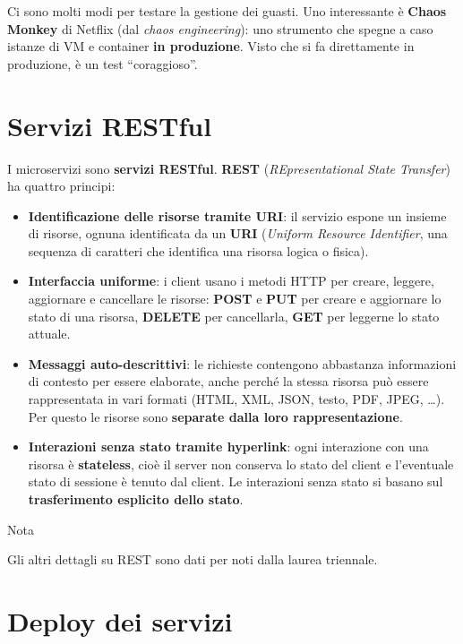 Ci sono molti modi per testare la gestione dei guasti. Uno interessante
è \textbf{Chaos Monkey} di Netflix (dal \emph{chaos engineering}): uno
strumento che spegne a caso istanze di VM e container \textbf{in
produzione}. Visto che si fa direttamente in produzione, è un test
``coraggioso''.

\section{Servizi RESTful}\label{servizi-restful}

I microservizi sono \textbf{servizi RESTful}. \textbf{REST}
(\emph{REpresentational State Transfer}) ha quattro principi:

\begin{itemize}
\tightlist
\item
  \textbf{Identificazione delle risorse tramite URI}: il servizio espone
  un insieme di risorse, ognuna identificata da un \textbf{URI}
  (\emph{Uniform Resource Identifier}, una sequenza di caratteri che
  identifica una risorsa logica o fisica).
\item
  \textbf{Interfaccia uniforme}: i client usano i metodi HTTP per
  creare, leggere, aggiornare e cancellare le risorse: \textbf{POST} e
  \textbf{PUT} per creare e aggiornare lo stato di una risorsa,
  \textbf{DELETE} per cancellarla, \textbf{GET} per leggerne lo stato
  attuale.
\item
  \textbf{Messaggi auto-descrittivi}: le richieste contengono abbastanza
  informazioni di contesto per essere elaborate, anche perché la stessa
  risorsa può essere rappresentata in vari formati (HTML, XML, JSON,
  testo, PDF, JPEG, \ldots). Per questo le risorse sono \textbf{separate
  dalla loro rappresentazione}.
\item
  \textbf{Interazioni senza stato tramite hyperlink}: ogni interazione
  con una risorsa è \textbf{stateless}, cioè il server non conserva lo
  stato del client e l'eventuale stato di sessione è tenuto dal client.
  Le interazioni senza stato si basano sul \textbf{trasferimento
  esplicito dello stato}.
\end{itemize}

\begin{boxnote}{Nota}

Gli altri dettagli su REST sono dati per noti dalla laurea triennale.

\end{boxnote}

\section{Deploy dei servizi}\label{deploy-dei-servizi}

